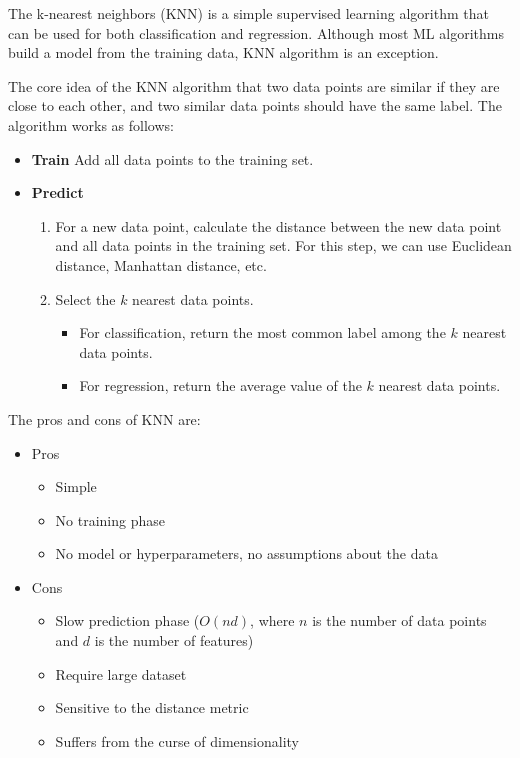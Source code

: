 \documentclass[a4paper,12pt]{article}
\begin{document}
The k-nearest neighbors (KNN) is a simple supervised learning algorithm that can be used for both classification and regression. Although most ML algorithms build a model from the training data, KNN algorithm is an exception.

The core idea of the KNN algorithm that two data points are similar if they are close to each other, and two similar data points should have the same label. The algorithm works as follows:
\begin{itemize}
  \item \textbf{Train} Add all data points to the training set.
  \item \textbf{Predict}
    \begin{enumerate}
      \item For a new data point, calculate the distance between the new data point and all data points in the training set. For this step, we can use Euclidean distance, Manhattan distance, etc.
      \item Select the $k$ nearest data points.
        \begin{itemize}
          \item For classification, return the most common label among the $k$ nearest data points.
          \item For regression, return the average value of the $k$ nearest data points.
        \end{itemize}
    \end{enumerate}
\end{itemize}

The pros and cons of KNN are:
\begin{itemize}
  \item Pros
    \begin{itemize}
      \item Simple
      \item No training phase
      \item No model or hyperparameters, no assumptions about the data
    \end{itemize}
  \item Cons
    \begin{itemize}
      \item Slow prediction phase ($O(nd)$, where $n$ is the number of data points and $d$ is the number of features)
      \item Require large dataset
      \item Sensitive to the distance metric
      \item Suffers from the curse of dimensionality
    \end{itemize}
\end{itemize}
\end{document}
